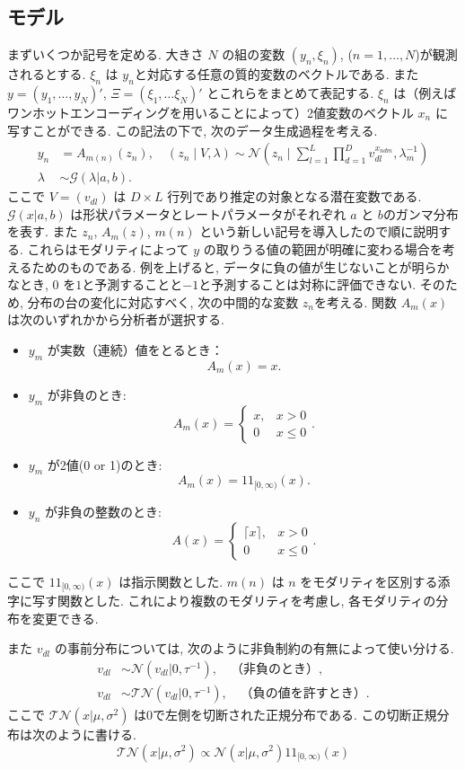 \documentclass[a4paper,12ptc]{jsarticle} %
\newcommand{\normal}{\mathcal{N}}
\newcommand{\truncnorm}{\mathcal{TN}}
\newcommand{\gam}{\mathcal{G}}
\newcommand{\one}{1\!\!1}
\begin{document}
\subsection{モデル}
まずいくつか記号を定める. 大きさ $N$ の組の変数 $(y_n, \xi_n)$, ($n=1,\ldots, N$)が観測されるとする. $\xi_n$ は $y_n$と対応する任意の質的変数のベクトルである. また $y=(y_1, \ldots, y_N)'$, $\Xi=(\xi_1, \ldots \xi_N)'$ とこれらをまとめて表記する.
$\xi_n$ は（例えばワンホットエンコーディングを用いることによって）2値変数のベクトル $x_n$ に写すことができる. この記法の下で, 次のデータ生成過程を考える.
\begin{align}
y_{n} &= A_{m(n)}(z_{n}), \quad (z_{n} \mid V, \lambda) \sim \mathcal{N}\left(z_n \mid \sum_{l=1}^L \prod_{d=1}^Dv_{dl}^{x_{ndm}}, \lambda^{-1}_m\right)  \label{eq_mod1}\\
\lambda & \sim \gam(\lambda | a,b). \nonumber
\end{align}
ここで $V=(v_{dl})$ は $D \times L$  行列であり推定の対象となる潜在変数である. $\gam(x|a,b)$ は形状パラメータとレートパラメータがそれぞれ $a$ と $b$のガンマ分布を表す. また $z_n$, $A_{m}(z)$, $m(n)$ という新しい記号を導入したので順に説明する. これらはモダリティによって $y$ の取りうる値の範囲が明確に変わる場合を考えるためのものである.
例を上げると, データに負の値が生じないことが明らかなとき, $0$ を$1$と予測することと$-1$と予測することは対称に評価できない.
そのため, 分布の台の変化に対応すべく, 次の中間的な変数 $z_n$を考える.
関数 $A_m(x)$ は次のいずれかから分析者が選択する.
\begin{itemize}
\item $y_m$ が実数（連続）値をとるとき： 
$$
A_m(x)=x.
$$
\item $y_m$ が非負のとき:
$$
A_m(x)=\begin{cases}x, &x>0\\0 &x\leq 0\end{cases}.
$$
\item
$y_m$ が2値(0 or 1)のとき:
$$
A_m(x)=\one_{[0,\infty)}(x).
$$
\item
$y_n$ が非負の整数のとき:
$$
A(x)=\begin{cases}\lceil x\rceil, & x>0\\0 &x\leq 0\end{cases}.
$$
\end{itemize}
ここで $\one_{[0,\infty)}(x)$ は指示関数とした.
$m(n)$ は $n$ をモダリティを区別する添字に写す関数とした. これにより複数のモダリティを考慮し, 各モダリティの分布を変更できる.

また $v_{dl}$ の事前分布については, 次のように非負制約の有無によって使い分ける.
\begin{align}
v_{dl} & \sim \normal(v_{dl} | 0,\tau^{-1}), \quad  \mbox{（非負のとき）} \label{eq_prior1}, \\
v_{dl} & \sim \truncnorm(v_{dl} | 0, \tau^{-1}), \quad  \mbox{（負の値を許すとき）.} \label{eq_prior2}
\end{align}
ここで $\truncnorm(x | \mu, \sigma^2)$ は0で左側を切断された正規分布である.
この切断正規分布は次のように書ける.
\begin{equation*}
   \truncnorm(x | \mu, \sigma^2) \propto    \normal(x | \mu, \sigma^2) \one_{[0,\infty)}(x) 
\end{equation*}
\end{document}
